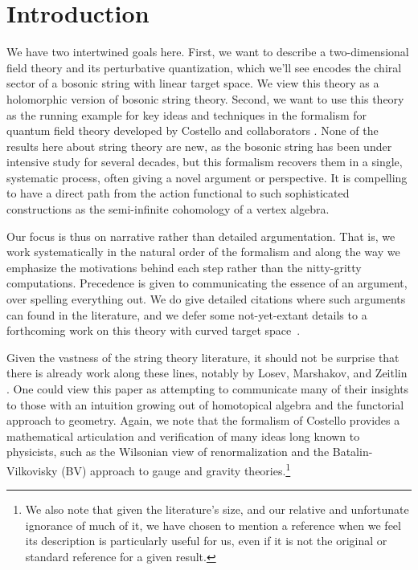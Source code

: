 \section{Introduction}

We have two intertwined goals here.
First, we want to describe a two-dimensional field theory
and its perturbative quantization,
which we'll see encodes the chiral sector of a bosonic string with linear target space.
We view this theory as a holomorphic version of bosonic string theory.
Second, we want to use this theory as the running example for key ideas and techniques in the formalism for quantum field theory developed by Costello and collaborators \cite{CosBook, CG1,CG2, others}.
None of the results here about string theory are new, 
as the bosonic string has been under intensive study for several decades,
but this formalism recovers them in a single, systematic process,
often giving a novel argument or perspective.
It is compelling to have a direct path from the action functional to such sophisticated constructions as the semi-infinite cohomology of a vertex algebra.

Our focus is thus on narrative rather than detailed argumentation.
That is, we work systematically in the natural order of the formalism and along the way we emphasize the motivations behind each step rather than the nitty-gritty computations. 
Precedence is given to communicating the essence of an argument, over spelling everything out.
We do give detailed citations where such arguments can found in the literature,
and we defer some not-yet-extant details to a forthcoming work on this theory with curved target space~\cite{GWcurved}.

Given the vastness of the string theory literature,
it should not be surprise that there is already work along these lines,
notably by Losev, Marshakov, and Zeitlin \cite{LMZ}.
One could view this paper as attempting to communicate many of their insights to those with an intuition growing out of homotopical algebra and the functorial approach to geometry.
Again, we note that the formalism of Costello provides a mathematical articulation and verification of many ideas long known to physicists, such as the Wilsonian view of renormalization and the Batalin-Vilkovisky (BV) approach to gauge and gravity theories.\footnote{We also note that given the literature's size,
and our relative and unfortunate ignorance of much of it,
we have chosen to mention a reference when we feel its description is particularly useful for us, 
even if it is not the original or standard reference for a given result.}

